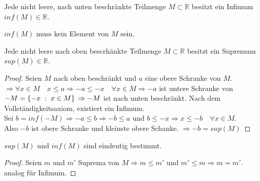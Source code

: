 \documentclass[a4paper,titlepage,oneside]{article}
\def\R{\ensuremath{\mathbb{R}} }
\def\fa{\ensuremath{\forall}}
\def\sp{\hspace{0,1cm}}
\newcommand{\menge}[2]{\ensuremath{\left\{#1\sp : \sp #2\right\}}}
\theoremstyle{thmstyle}
\begin{document}
\begin{subsatz}[Vollständigkeitsaxiom]
Jede nicht leere, nach unten beschränkte Teilmenge \(M \subset \R\)  besitzt ein Infimum \(inf(M) \in \R\).
\end{subsatz}

\begin{subbem}
\(inf(M)\) muss kein Element von \(M\) sein.
\end{subbem}

\begin{subprop}
Jede nicht leere nach oben bescrhänkte Teilmenge \(M \subset \R\) besitzt ein Supremum \(sup(M) \in \R\).
\begin{proof}
Seien \(M\) nach oben beschränkt und \(a\) eine obere Schranke von \(M\).\\
\(\Rightarrow \fa x \in M  \quad x \le a \Rightarrow -a \le -x \quad \fa x \in M \Rightarrow -a\) ist untere Schranke von \(-M = \menge{-x}{x \in M}\\
\Rightarrow -M\) ist nach unten beschränkt. Nach dem Vollständigkeitsaxiom, existiert ein Infimum.\\
Sei \(b= inf(-M) \Rightarrow -a \le b \Rightarrow -b \le a \text{ und } b \le -x \Rightarrow x \le -b \quad \forall x \in M\).\\
Also \(-b\) ist obere Schranke und kleinste obere Schanke. \(\Rightarrow -b = sup(M)\)
\end{proof}
\end{subprop}

\begin{subprop}
\(sup(M) \text{ und } inf(M)\) sind eindeutig bestimmt.
\begin{proof}
Seien \(m\) und \(m'\) Suprema von \(M \Rightarrow m \le m' \text{ und } m' \le m \Rightarrow m = m'\).\\
analog für Infimum.
\end{proof}
\end{subprop}

\newpage
\end{document}
